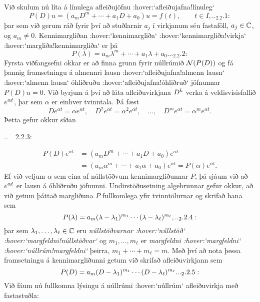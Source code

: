 \noindent
Við skulum nú líta á línulega afleiðujöfnu :hover:`afleiðujafna!línuleg`
 \begin{equation*}P(D)u = (a_mD^m+\cdots+a_1D+a_0)u
=f(t), \qquad t\in I,

.. _2.2.1:

 \end{equation*}
þar sem við gerum ráð fyrir því að stuðlarnir $a_j$ í virkjanum séu
fastaföll, $a_j\in {\mathbb C}$, og $a_m\neq 0$.
Kennimargliðan :hover:`kennimargliða`
 :hover:`kennimargliða!virkja` :hover:`margliða!kennimargliða` er þá 
\begin{equation*}
P(\lambda)=a_m\lambda^m+\cdots+a_1\lambda+a_0.

.. _2.2.2:

\end{equation*}
Fyrsta viðfangsefni okkar  er að finna grunn fyrir núllrúmið 
${\cal N}(P(D))$ og fá 
þannig framsetningu á almennri lausn :hover:`afleiðujafna!almenn lausn`
 :hover:`almenn lausn`
óhliðruðu :hover:`afleiðujafna!óhliðruð` jöfnunnar $P(D)u=0$. Við
byrjum á því að láta afleiðuvirkjana
$D\sp k$ verka á veldisvísisfallið $e\sp{\alpha t}$, þar sem $\alpha$
er einhver tvinntala. Þá fæst
$$
De^{\alpha t}=\alpha e^{\alpha t},\quad
D^2e^{\alpha t}=\alpha^2 e^{\alpha t},\quad
\dots , \quad 
D^me^{\alpha t}=\alpha^m e^{\alpha t}.
$$ 
Þetta gefur okkur síðan 

.. _2.2.3:

\begin{align*}
P(D)e^{\alpha t}&=(a_mD^m+\cdots+a_1D+a_0)e^{\alpha t} \\
&=(a_m{\alpha}^m+\cdots+a_1{\alpha}+a_0)e^{\alpha
t}=P(\alpha)e^{\alpha t}.\nonumber
\end{align*}
Ef við veljum $\alpha$ sem eina af núllstöðvum kennimargliðunnar $P$,
þá sjáum við að $e\sp{\alpha t}$ er lausn á óhliðruðu jöfnunni.
Undirstöðusetning algebrunnar gefur okkur, að við getum þáttað
margliðuna $P$ fullkomlega yfir tvinntölurnar og skrifað hana sem
 \begin{equation*}P(\lambda)=a_m(\lambda-\lambda_1)\sp{m_1}\cdots
(\lambda-\lambda_\ell)\sp{m_\ell},

.. _2.2.4:

 \end{equation*}
þar sem $\lambda_1,\dots,\lambda_\ell\in {\mathbb C}$ eru {\it
núllstöðvarnar :hover:`núllstöð` :hover:`margfeldni!núllstöðvar`}
og $m_1,\dots,m_\ell$ er {\it
margfeldni :hover:`margfeldni` :hover:`núllrúm!margfeldni`} þeirra, $m_1+\cdots+m_\ell=m$.
Með því að nota þessa framsetningu á kennimargliðunni getum við skrifað
afleiðuvirkjann sem 
 \begin{equation*}P(D)=a_m(D-\lambda_1)\sp{m_1}\cdots(D-\lambda_\ell)\sp{m_\ell}.

.. _2.2.5:

 \end{equation*}
Við fáum nú fullkomna lýsingu á núllrúmi :hover:`núllrúm` afleiðuvirkja með fastastuðla:

